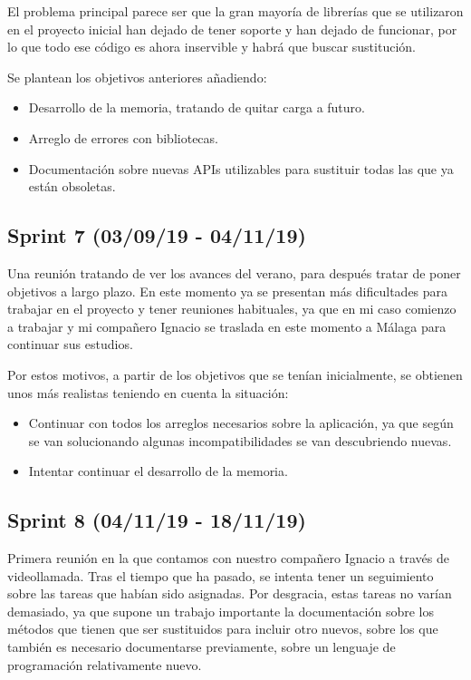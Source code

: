 El problema principal parece ser que la gran mayoría de librerías que se utilizaron en el proyecto inicial han dejado de tener soporte y han dejado de funcionar, por lo que todo ese código es ahora inservible y habrá que buscar sustitución.

Se plantean los objetivos anteriores añadiendo:

\begin{itemize}
\item Desarrollo de la memoria, tratando de quitar carga a futuro.
\item Arreglo de errores con bibliotecas.
\item Documentación sobre nuevas APIs utilizables para sustituir todas las que ya están obsoletas.
\end{itemize}

\subsection{Sprint 7 (03/09/19 - 04/11/19)}

Una reunión tratando de ver los avances del verano, para después tratar de poner objetivos a largo plazo. En este momento ya se presentan más dificultades para trabajar en el proyecto y tener reuniones habituales, ya que en mi caso comienzo a trabajar y mi compañero Ignacio se traslada en este momento a Málaga para continuar sus estudios.

Por estos motivos, a partir de los objetivos que se tenían inicialmente, se obtienen unos más realistas teniendo en cuenta la situación:

\begin{itemize}
\item Continuar con todos los arreglos necesarios sobre la aplicación, ya que según se van solucionando algunas incompatibilidades se van descubriendo nuevas.
\item Intentar continuar el desarrollo de la memoria.
\end{itemize}

\subsection{Sprint 8 (04/11/19 - 18/11/19)}

Primera reunión en la que contamos con nuestro compañero Ignacio a través de videollamada. Tras el tiempo que ha pasado, se intenta tener un seguimiento sobre las tareas que habían sido asignadas. Por desgracia, estas tareas no varían demasiado, ya que supone un trabajo importante la documentación sobre los métodos que tienen que ser sustituidos para incluir otro nuevos, sobre los que también es necesario documentarse previamente, sobre un lenguaje de programación relativamente nuevo.

